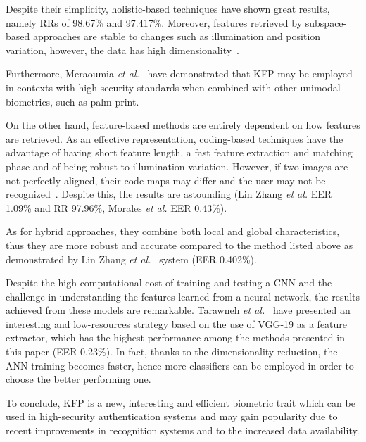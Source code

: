 \documentclass[journal]{IEEEtran}
\begin{document}
Despite their simplicity, holistic-based techniques have shown great results, namely RRs of 98.67\% and 97.417\%.
Moreover, features retrieved by subspace-based approaches are stable to changes such as illumination and position variation, however, the data has high dimensionality~\cite{imran2013efficient}.

Furthermore, Meraoumia \textit{et al.}~\cite{Meraoumia} have demonstrated that KFP may be employed in contexts with high security standards when combined with other unimodal biometrics, such as palm print. 

On the other hand, feature-based methods are entirely dependent on how features are retrieved. As an effective representation, coding-based techniques have the advantage of having short feature length, a fast feature extraction and matching phase and of being robust to illumination variation. However, if two images are not perfectly aligned, their code maps may differ and the user may not be recognized~\cite{biometricknuckleprint}.
Despite this, the results are astounding (Lin Zhang \textit{et al.} EER 1.09\% and RR 97.96\%, Morales \textit{et al.} EER 0.43\%). 

As for hybrid approaches, they combine both local and global characteristics, thus they are more robust and accurate compared to the method listed above as demonstrated by Lin Zhang \textit{et al.}~\cite{Zhang1} system (EER 0.402\%).

Despite the high computational cost of training and testing a CNN and the challenge in understanding the features learned from a neural network, the results achieved from these models are remarkable.
Tarawneh \textit{et al.}~\cite{tarawneh2022deepknuckle} have presented an interesting and low-resources strategy based on the use of VGG-19 as a feature extractor, which has the highest performance among the methods presented in this paper (EER 0.23\%). In fact, thanks to the dimensionality reduction, the ANN training becomes faster, hence more classifiers can be employed in order to choose the better performing one.

To conclude, KFP is a new, interesting and efficient biometric trait which can be used in high-security authentication systems and may gain popularity due to recent improvements in recognition systems and to the increased data availability.


\end{document}
